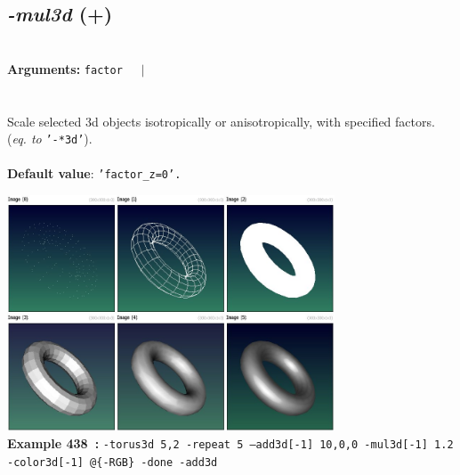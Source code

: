 \documentclass[a4paper,11pt,twoside]{book}
\begin{document}
\subsection{\emph{-mul3d} (+)}\vspace*{-0.5em}
~\\\textbf{Arguments: } 
{\small \texttt{factor}}~~~$|$\\
\\~\\
Scale selected 3d objects isotropically or anisotropically, with specified factors.
~\\(\emph{eq. to} {\small \texttt{'-*3d'}}).
~\\~\\\textbf{Default value}: {\small \texttt{'factor\_z=0'.}}
\begin{center}\includegraphics[keepaspectratio=true,height=7cm,width=\textwidth]{img/gmic_def438.jpg}\\
{\footnotesize \textbf{Example 438~:} \texttt{-torus3d 5,2 -repeat 5 --add3d[-1] 10,0,0 -mul3d[-1] 1.2 -color3d[-1] @\{-RGB\} -done -add3d}}
\end{center}
\end{document}
